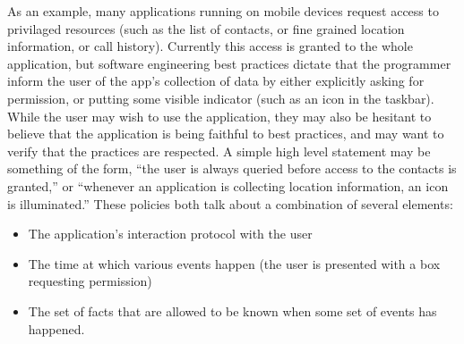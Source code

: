 \documentclass[conference]{IEEEtran}
\theoremstyle{definition}
\newcommand{\comment}[3][\color{red}]{{#1{[{#2}: {#3}]}}}
\newcommand{\kris}[1]{\comment[\color{orange}]{kris}{#1}}
\begin{document}
As an example, many applications running on mobile devices request access
to privilaged resources (such as the list of contacts, or fine grained
location information, or call history).  
Currently this access is granted to the whole
application, but software engineering best practices dictate that the
programmer inform the user of the app's collection of data by either
explicitly asking for permission, or putting some visible indicator
(such as an icon in the taskbar).  While the user may wish to use the
application, they may also be hesitant to believe that the application
is being faithful to best practices, and may want to verify that the
practices are respected.  A simple high level statement may be
something of the form, ``the user is always queried before access to
the contacts is granted,'' or ``whenever an application is collecting
location information, an icon is illuminated.''  These policies both
talk about a combination of several elements:

\begin{itemize}
\item The application's interaction protocol with the user
\item The time at which various events happen (the user is presented
  with a box requesting permission)
\item The set of facts that are allowed to be known when some set of
  events has happened.
\end{itemize}

\end{document}
